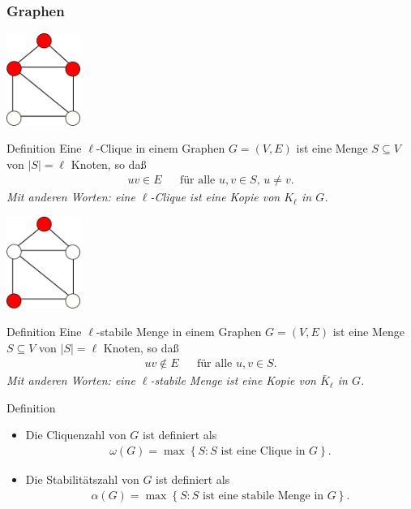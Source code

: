 \documentclass[aspectratio=1610, 11pt]{beamer}
\newcommand\cbc[1]{\left\{{#1}\right\}}
\newcommand{\mytitle}{Graphen}
\begin{document}
\begin{frame}\frametitle{\mytitle}
	\begin{overprint}
		\hfill\includegraphics[height=30mm]{images/house_clique.pdf}
	\begin{block}{Definition}
		Eine \alert{$\ell$-Clique} in einem Graphen $G=(V,E)$ ist eine Menge $S\subseteq V$ von $|S|=\ell$ Knoten, so da\ss
		\begin{align*}
			uv\in E&&\mbox{f\"ur alle }u,v\in S,\,u\neq v.
		\end{align*}
		\itshape Mit anderen Worten: eine $\ell$-Clique ist eine Kopie von $K_\ell$ in $G$.
	\end{block}
		\hfill\includegraphics[height=30mm]{images/house_ind.pdf}
	\begin{block}{Definition}
		Eine \alert{$\ell$-stabile Menge} in einem Graphen $G=(V,E)$ ist eine Menge $S\subseteq V$ von $|S|=\ell$  Knoten, so da\ss
		\begin{align*}
			uv\not\in E&&\mbox{f\"ur alle }u,v\in S.
		\end{align*}
		\itshape Mit anderen Worten: eine $\ell$-stabile Menge ist eine Kopie von $\bar K_\ell$ in $G$.
	\end{block}
	\begin{block}{Definition}
		\begin{itemize}
			\item Die \alert{Cliquenzahl} von $G$ ist definiert als
				\begin{align*}
					\omega(G)=\max\cbc{S:S\mbox{ ist eine Clique in }G}.
				\end{align*}
			\item Die \alert{Stabilit\"atszahl} von $G$ ist definiert als
				\begin{align*}
					\alpha(G)=\max\cbc{S:S\mbox{ ist eine stabile Menge in }G}.
				\end{align*}
		\end{itemize}
	\end{block}
	\end{overprint}
\end{frame}
\end{document}
